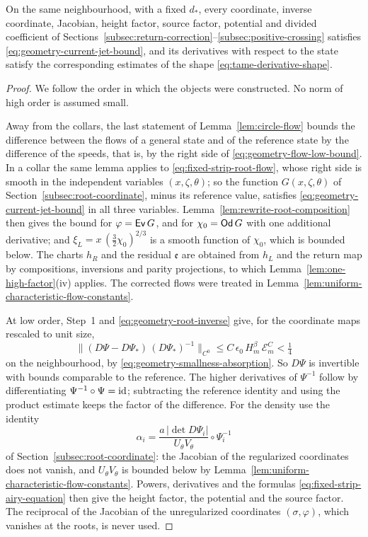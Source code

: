 \begin{lemma}
\label{lem:current-geometric-jets}
On the same neighbourhood, with a fixed $d_*$, every coordinate,
inverse coordinate, Jacobian, height factor, source factor, potential
and divided coefficient of
Sections~\ref{subsec:return-correction}--\ref{subsec:positive-crossing}
satisfies \eqref{eq:geometry-current-jet-bound}, and its derivatives
with respect to the state satisfy the corresponding estimates of the
shape \eqref{eq:tame-derivative-shape}.
\end{lemma}

\begin{proof}
We follow the order in which the objects were constructed. No norm of
high order is assumed small.

Away from the collars, the last statement of
Lemma~\ref{lem:circle-flow} bounds the difference between the flows
of a general state and of the reference state by the difference of
the speeds, that is, by the right side of
\eqref{eq:geometry-flow-low-bound}. In a collar the same lemma
applies to \eqref{eq:fixed-strip-root-flow}, whose right side is
smooth in the independent variables $(x,\zeta,\theta)$; so the
function $G(x,\zeta,\theta)$ of Section~\ref{subsec:root-coordinate},
minus its reference value, satisfies
\eqref{eq:geometry-current-jet-bound} in all three variables.
Lemma~\ref{lem:rewrite-root-composition} then gives the bound for
$\varphi=\mathsf{Ev}\,G$, and for $\chi_0=\mathsf{Od}\,G$ with one additional
derivative; and $\xi_L=x\,(\tfrac32\chi_0)^{2/3}$ is a smooth function
of $\chi_0$, which is bounded below. The charts $h_R$ and the residual
$\mathfrak e$ are obtained from $h_L$ and the return map by
compositions, inversions and parity projections, to which
Lemma~\ref{lem:one-high-factor}(iv) applies. The corrected flows were
treated in Lemma~\ref{lem:uniform-characteristic-flow-constants}.

At low order, Step~1 and \eqref{eq:geometry-root-inverse} give, for
the coordinate maps rescaled to unit size,
\[
 \bigl\|(D\Psi-D\Psi_*)\,(D\Psi_*)^{-1}\bigr\|_{C^0}
 \le C\,\epsilon_0\,H_m^\beta\,\mathcal E_m^{C}<\tfrac14
\]
on the neighbourhood, by \eqref{eq:geometry-smallness-absorption}. So
$D\Psi$ is invertible with bounds comparable to the reference. The
higher derivatives of $\Psi^{-1}$ follow by differentiating
$\Psi^{-1}\circ\Psi=\mathrm{id}$; subtracting the reference identity and
using the product estimate keeps the factor of the difference. For
the density use the identity
\[
 \alpha_i=\frac{a\,|\det D\Psi_i|}{U_\theta V_\theta}\circ\Psi_i^{-1}
\]
of Section~\ref{subsec:root-coordinate}: the Jacobian of the
regularized coordinates does not vanish, and $U_\theta V_\theta$ is
bounded below by
Lemma~\ref{lem:uniform-characteristic-flow-constants}. Powers,
derivatives and the formulas \eqref{eq:fixed-strip-airy-equation}
then give the height factor, the potential and the source factor. The
reciprocal of the Jacobian of the unregularized coordinates
$(\sigma,\varphi)$, which vanishes at the roots, is never used.


\end{proof}
